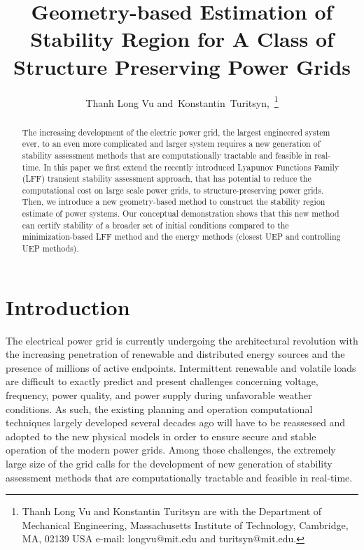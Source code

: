\documentclass[final]{IEEEtran}
\title{Geometry-based Estimation of Stability Region for A Class of Structure Preserving Power Grids}
\author{Thanh Long Vu and~Konstantin~Turitsyn,~\IEEEmembership{Member,~IEEE}\thanks{Thanh Long Vu and Konstantin Turitsyn are with the Department of Mechanical Engineering, Massachusetts Institute of Technology, Cambridge, MA, 02139 USA e-mail: longvu@mit.edu and turitsyn@mit.edu.

}}
\begin{document}
\maketitle
\begin{abstract}
The increasing development of the electric power grid, the largest engineered system ever, to an even more complicated and larger system requires a new generation of stability assessment methods that are computationally tractable and feasible in real-time. In this paper we first  extend the recently introduced Lyapunov Functions Family (LFF) transient
stability assessment approach, that has potential to reduce the computational cost on  large scale power grids,
to structure-preserving power grids. Then, we introduce a new geometry-based method to 
construct the stability region estimate of power systems. Our conceptual demonstration shows that this new method can certify stability of a broader set of initial conditions compared
to the minimization-based LFF method and the energy methods (closest UEP and controlling UEP methods).
\end{abstract}

\section{Introduction}


The electrical power grid is currently undergoing the architectural revolution with the increasing penetration of renewable and distributed energy sources and the presence of millions of active endpoints. Intermittent renewable and volatile loads are difficult to exactly predict and present challenges concerning voltage, frequency, power quality, and power supply during unfavorable weather conditions. As such, the existing planning and operation computational techniques largely developed several decades ago will have to be reassessed and adopted to the new physical models
in order to ensure secure and stable operation of the modern power grids. Among those challenges, 
the extremely large size of the grid calls for the development of new generation of stability assessment methods that are computationally tractable and feasible in real-time. 
\end{document}
